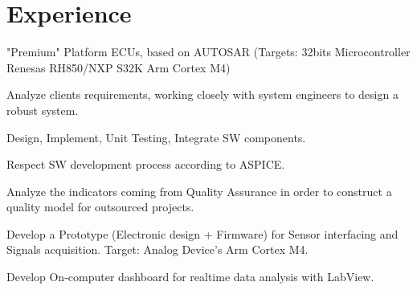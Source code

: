 \documentclass[]{deedy-resume-openfont}
\begin{document}
\begin{minipage}[t]{0.66\textwidth} 


\section{Experience}
\vspace{\topsep} %
\begin{tightemize}
\item "Premium" Platform ECUs, based on AUTOSAR (Targets: 32bits Microcontroller  Renesas RH850/NXP S32K Arm Cortex M4)
\item Analyze clients requirements, working  closely with system engineers to design a robust system.
\item Design, Implement, Unit Testing, Integrate SW components.
\item Respect SW development process according to ASPICE.
\end{tightemize}
\sectionsep

\begin{tightemize}
\item Analyze the indicators coming from Quality Assurance in order to construct a quality model for outsourced projects.

\end{tightemize}
\sectionsep

\begin{tightemize}
\item Develop a Prototype (Electronic design + Firmware) for Sensor interfacing and Signals acquisition. Target: Analog Device's Arm Cortex M4.
\item Develop On-computer dashboard for realtime data analysis with LabView. 
\end{tightemize}
\sectionsep






\end{minipage}
\end{document}
